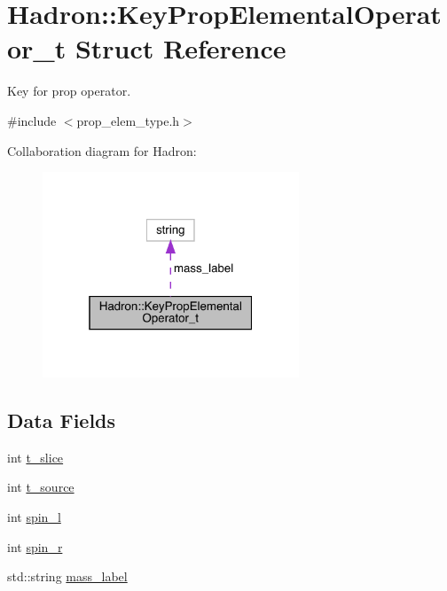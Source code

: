 \hypertarget{structHadron_1_1KeyPropElementalOperator__t}{}\section{Hadron\+:\+:Key\+Prop\+Elemental\+Operator\+\_\+t Struct Reference}
\label{structHadron_1_1KeyPropElementalOperator__t}


Key for prop operator.  




{\ttfamily \#include $<$prop\+\_\+elem\+\_\+type.\+h$>$}



Collaboration diagram for Hadron\+:\nopagebreak
\begin{figure}[H]
\begin{center}
\leavevmode
\includegraphics[width=217pt]{d5/d75/structHadron_1_1KeyPropElementalOperator__t__coll__graph}
\end{center}
\end{figure}
\subsection*{Data Fields}
\begin{DoxyCompactItemize}
\item 
int \mbox{\hyperlink{structHadron_1_1KeyPropElementalOperator__t_afd52593f348fdfe1a95dc4feec590ed1}{t\+\_\+slice}}
\item 
int \mbox{\hyperlink{structHadron_1_1KeyPropElementalOperator__t_a55ff9327bc33e9bc52d9e5250cd1d0ae}{t\+\_\+source}}
\item 
int \mbox{\hyperlink{structHadron_1_1KeyPropElementalOperator__t_a051b68fa38fa7cc1b9d94caf437a511c}{spin\+\_\+l}}
\item 
int \mbox{\hyperlink{structHadron_1_1KeyPropElementalOperator__t_a2dc2d71b3f02e9a1c3350fe46be5c0c8}{spin\+\_\+r}}
\item 
std\+::string \mbox{\hyperlink{structHadron_1_1KeyPropElementalOperator__t_a3ec5ba8f0dd04e0ed37227fec6700b39}{mass\+\_\+label}}
\end{DoxyCompactItemize}


